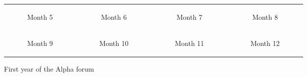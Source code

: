 \begin{minipage}[t]{0.7\textwidth}
\begin{figure}[H]
\begin{adjustbox}{width=\textwidth, keepaspectratio}
\begin{tabular}{cccc}
\begin{subfigure}[b]{0.24\textwidth}
              \caption{Month 5}
              \label{fig:month5}
          \end{subfigure} &
          \begin{subfigure}[b]{0.24\textwidth}
              \centering
              
              \caption{Month 6}
              \label{fig:month6}
          \end{subfigure} &
          \begin{subfigure}[b]{0.24\textwidth}
              \centering
              
              \caption{Month 7}
              \label{fig:month7}
          \end{subfigure} &
          \begin{subfigure}[b]{0.24\textwidth}
              \centering
              
              \caption{Month 8}
              \label{fig:month8}
          \end{subfigure} \\
          \begin{subfigure}[b]{0.24\textwidth}
              \centering
              
              \caption{Month 9}
              \label{fig:month9}
          \end{subfigure} &
          \begin{subfigure}[b]{0.24\textwidth}
              \centering
              
              \caption{Month 10}
              \label{fig:month10}
          \end{subfigure} &
          \begin{subfigure}[b]{0.24\textwidth}
              \centering
              
              \caption{Month 11}
              \label{fig:month11}
          \end{subfigure} &
          \begin{subfigure}[b]{0.24\textwidth}
              \centering
              
              \caption{Month 12}
              \label{fig:month12}
          \end{subfigure}
      \end{tabular}
  \end{adjustbox}
  \caption{First year of the Alpha forum}
  \label{fig:monthlyGraphs}
\end{figure}
\end{minipage}
